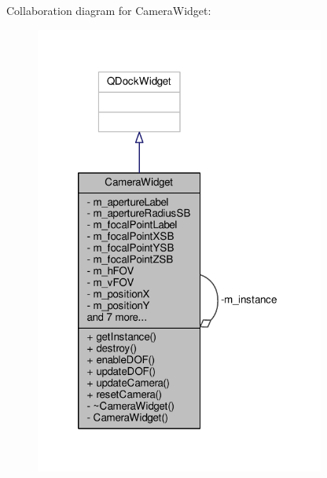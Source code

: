 Collaboration diagram for Camera\-Widget\-:
\nopagebreak
\begin{figure}[H]
\begin{center}
\leavevmode
\includegraphics[width=270pt]{class_camera_widget__coll__graph}
\end{center}
\end{figure}
